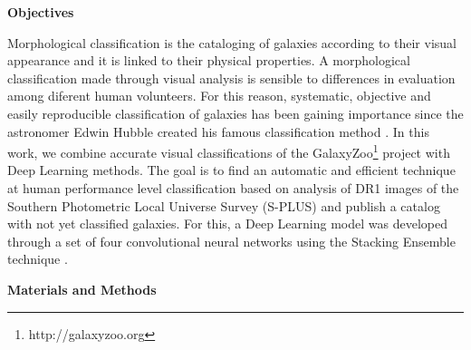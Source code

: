 \documentclass[10pt, a4paper, twocolumn]{article}
\begin{document}


\begin{center}
  \bf\fontsize{13}{15.6}\selectfont Objectives
\end{center}

Morphological classification is the cataloging of galaxies according to their visual appearance and it is linked to their physical properties. A morphological classification made through visual analysis is sensible to differences in evaluation among diferent human volunteers. For this reason, systematic, objective and easily reproducible classification of galaxies has been gaining importance since the astronomer Edwin Hubble created his famous classification method \cite{hubble1926}. In this work, we combine accurate visual classifications of the GalaxyZoo\footnote{http://galaxyzoo.org} project with Deep Learning methods. The goal is to find an automatic and efficient technique at human performance level classification based on analysis of DR1 images of the Southern Photometric Local Universe Survey (S-PLUS) \cite{oliveira2019} and publish a catalog with not yet classified galaxies. For this, a Deep Learning model was developed through a set of four convolutional neural networks using the Stacking Ensemble technique \cite{Wolpert1992}.

\begin{center}
  \bf\fontsize{13}{15.6}\selectfont Materials and Methods
\end{center}
\end{document}
